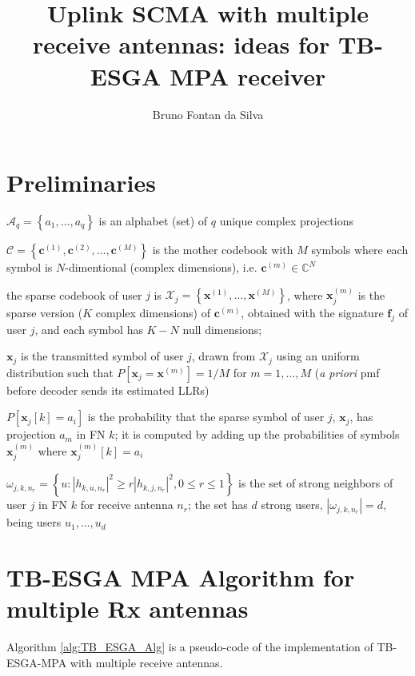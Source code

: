 \documentclass[10pt,oneside]{article}
\title{Uplink SCMA with multiple receive antennas: ideas for TB-ESGA MPA receiver}
\author{Bruno Fontan da Silva}
\newcommand{\Abs}[1]{\left| #1 \right|}
\begin{document}
\maketitle


\section{Preliminaries}
$\mathcal{A}_q = \left\lbrace a_1, \ldots, a_q \right\rbrace$ is an alphabet (set) of $q$ unique complex projections

$\mathcal{C}=\left\lbrace \mathbf{c}^{(1)}, \mathbf{c}^{(2)}, \ldots, \mathbf{c}^{(M)} \right\rbrace$ is the mother codebook with $M$ symbols where each symbol is $N$-dimentional (complex dimensions), i.e. $\mathbf{c}^{(m)}\in \mathds{C}^N$

the sparse codebook of user $j$ is $\mathcal{X}_j=\left\lbrace \mathbf{x}^{(1)}, \ldots, \mathbf{x}^{(M)} \right\rbrace$, where $\mathbf{x}^{(m)}_j$ is the sparse version ($K$ complex dimensions) of $\mathbf{c}^{(m)}$, obtained with the signature $\mathbf{f}_j$ of user $j$, and each symbol has $K-N$ null dimensions; 

$\mathbf{x}_j$ is the transmitted symbol of user $j$, drawn from $\mathcal{X}_j$ using an uniform distribution such that $P[\mathbf{x}_j=\mathbf{x}^{(m)}]=1/M$ for $m=1,\ldots,M$ (\textit{a priori} pmf before decoder sends its estimated LLRs) 


$P[\mathbf{x}_j[k]=a_{i}]$ is the probability that the sparse symbol of user $j$, $\mathbf{x}_j$, has projection $a_m$ in FN $k$; it is computed by adding up the probabilities of symbols $\mathbf{x}_j^{(m)}$ where $\mathbf{x}_j^{(m)}[k]=a_i$


$\omega_{j,k,n_r}=\left\lbrace u: \Abs{h_{k,u,n_r}}^2 \geq r \Abs{h_{k,j,n_r}}^2, 0\leq r \leq 1 \right \rbrace$ is the set of strong neighbors of user $j$ in FN $k$ for receive antenna $n_r$; the set has $d$ strong users, $\left| \omega_{j,k,n_r} \right|=d$, being users $u_1,\ldots,u_d$
 
\section{TB-ESGA MPA Algorithm for multiple Rx antennas}
Algorithm \ref{alg:TB_ESGA_Alg} is a pseudo-code of the implementation of TB-ESGA-MPA with multiple receive antennas.
 
\end{document}
